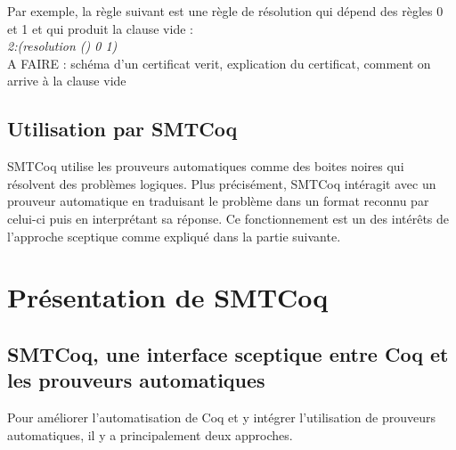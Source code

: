 \documentclass[11pt]{article}
\begin{document}
Par exemple, la règle suivant est une règle de résolution qui dépend des règles 0 et 1 et qui produit la clause vide : \\
\textit{2:(resolution () 0 1)} \\


A FAIRE : schéma d'un certificat verit, explication du certificat, comment on arrive à la clause vide


\subsection{Utilisation par SMTCoq}

SMTCoq utilise les prouveurs automatiques comme des boites noires qui résolvent des problèmes logiques. Plus précisément, SMTCoq intéragit avec un prouveur automatique en traduisant le problème dans un format reconnu par celui-ci puis en interprétant sa réponse. Ce fonctionnement est un des intérêts de l'approche sceptique comme expliqué dans la partie suivante.


\newpage 
\section{Présentation de SMTCoq}

\subsection{SMTCoq, une interface sceptique entre Coq et les prouveurs automatiques}\label{sceptique_autarcique}

Pour améliorer l'automatisation de Coq et y intégrer l'utilisation de prouveurs automatiques, il y a principalement deux approches.
\end{document}
